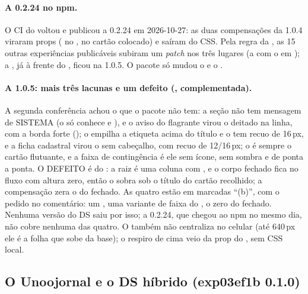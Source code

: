 \paragraph{A 0.2.24 no npm.} O CI do  voltou e
publicou a 0.2.24 em 2026-10-27: as duas compensações da 1.0.4 viraram
props ( no ,
 no cartão colocado) e saíram do CSS. Pela regra
da , as 15 outras experiências publicáveis subiram um
\emph{patch} nos três lugares (a  com o  em
); a , já à frente do , ficou na
1.0.5. O pacote só mudou o  e o .

\paragraph{A 1.0.5: mais três lacunas e um defeito (,
complementada).} A segunda conferência achou o que o pacote não tem: a seção
 não tem mensagem de SISTEMA (o  só conhece
 e ), e o aviso do flagrante virou o
 deitado na linha, com a borda forte
(); o  empilha a etiqueta acima do
título e o  tem recuo de 16\,px, e a ficha cadastral virou o
 sem cabeçalho, com recuo de 12/16\,px; o  é sempre o
cartão flutuante, e a faixa de contingência é ele sem ícone, sem sombra e de
ponta a ponta. O DEFEITO é do : a raiz é uma coluna com
, e o corpo fechado fica no fluxo com altura zero, então o 
sobra sob o título do cartão recolhido; a compensação zera o  do
fechado. As quatro estão em  marcadas
\enquote{(b)}, com o pedido no comentário: um ,
uma variante de faixa do , o  zero do 
fechado. Nenhuma versão do DS saiu por isso; a 0.2.24, que chegou ao npm no
mesmo dia, não cobre nenhuma das quatro. O  também não centraliza no celular (até 640\,px ele é a
folha que sobe da base); o respiro de cima veio da prop  do
, sem CSS local.

\subsection{O Unoojornal e o DS híbrido (exp03ef1b 0.1.0)}
\label{sec:ds-hibrido-exp03ef1b}

